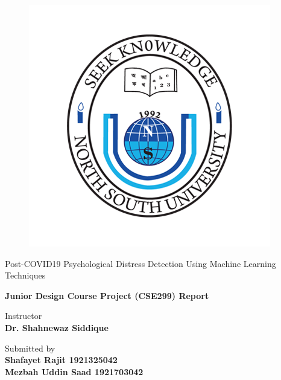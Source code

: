 \documentclass[12pt, english]{article}
\begin{document}
\date{}
\maketitle


\thispagestyle{empty}
	
	\begin{figure}[H]
	    \vspace{-1in}
		\includegraphics[scale = 0.5]{images/North-South-University.png}
		\centering
		\label{EscudoUABC}
	\end{figure}
	
	\begin{center}
	\vspace{0.8cm}
	\LARGE
	Post-COVID19 Psychological Distress Detection Using Machine Learning Techniques
	
	
	\vspace{1.7cm}	
	\Large
	\textbf{Junior Design Course Project (CSE299) Report}
	
	\vspace{1.3cm}
	\normalsize	
	Instructor \\
	\vspace{.3cm}
	\large
	\textbf{Dr. Shahnewaz Siddique} \\

	\vspace{1.3cm}
	\normalsize	
	Submitted by \\
	\vspace{.3cm}
	\large
	\textbf{Shafayet Rajit 1921325042 \\ Mezbah Uddin Saad 1921703042}
	
	\end{center}
	
\end{document}
